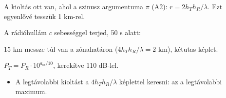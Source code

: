 A kioltás ott van, ahol a szinusz argumentuma $\pi$ (A2): $r=2h_Th_R/\lambda$. Ezt egyenlővé tesszük 1 km-rel.

\begin{center}\end{center}

A rádióhullám $c$ sebességgel terjed, 50 \textmu{}s alatt:

\begin{center}\end{center}

15 km messze túl van a zónahatáron ($4h_Th_R/\lambda=2$ km), kétutas képlet.

\begin{center}\end{center}

$P_T=P_R\cdot10^{a_\mathrm{sz}/10}$, kerekítve 110 dB-lel.

\begin{center}\end{center}
\begin{eredmeny}

\begin{center}\end{center}
\end{eredmeny}
\begin{figyelem}
\begin{itemize}
\item A legtávolabbi kioltást a $4h_Th_R/\lambda$ képlettel keresni: az a legtávolabbi maximum.
\end{itemize}
\end{figyelem}


